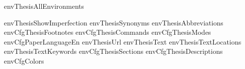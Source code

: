 \startenvironment envThesisAllEnvironments

\environment envThesisShowImperfection
\environment envThesisSynonyms
\environment envThesisAbbreviations
\environment envCfgThesisFootnotes
\environment envCfgThesisCommands
\environment envCfgThesisModes
\environment envCfgPaperLanguageEn
\environment envThesisUrl
\environment envThesisText
\environment envThesisTextLocations
\environment envThesisTextKeywords
\environment envCfgThesisSections
\environment envCfgThesisDescriptions
\environment envCfgColors

\stopenvironment